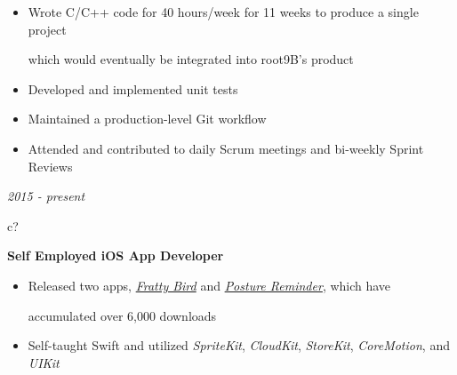 \documentclass[12pt,a4paper,sans]{moderncv} %
\begin{document}
 \vspace{-1 mm}
 \begin{itemize}
 \addtolength{\itemindent}{31.7 mm}
 \vspace{2 pt}
 \item Wrote C/C++ code for 40 hours/week for 11 weeks to produce a single project 
 
  \hspace{30.5 mm}  which would eventually be integrated into root9B's product
 
 \item Developed and implemented unit tests 
 
\item Maintained a production-level Git workflow
 
 \item Attended and contributed to daily Scrum meetings and bi-weekly Sprint Reviews
 \end{itemize}
 
 
 \textit{2015 - present}
\hspace{-1.7 mm}
\begin{tabular}{c?}
 \\
\end{tabular}
 \hspace{2 mm}
 \textbf{Self Employed iOS App Developer} 
 
 \begin{itemize}
 \addtolength{\itemindent}{31.7 mm}
 \item Released two apps, \href{https://itunes.apple.com/us/app/fratty-bird-the-game/id1143642394?mt=8}{\textit{Fratty Bird}} and \href{https://itunes.apple.com/us/app/posture-reminder/id1280214465?mt=8}{\textit{Posture Reminder}}, which have 
 
   \hspace{30.5 mm}  accumulated over 6,000 downloads
   
   \item Self-taught Swift and utilized \textit{SpriteKit}, \textit{CloudKit}, \textit{StoreKit}, \textit{CoreMotion}, and \textit{UIKit}
 \end{itemize}
 
\begin{comment}
Rank yourself on proficiency in each. I broke mine down into "Advanced Knowledge", "Working Proficiency", and "Limited Exposure"
\end{comment}
\end{document}
